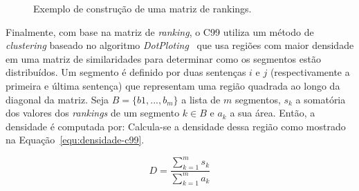 \begin{figure}[!h]
	\centering     %

	\caption{Exemplo de construção de uma matriz de rankings.%
	}
	\label{fig:exemplomatrixrank}
\end{figure}


Finalmente, com base na matriz de \textit{ranking}, o C99 utiliza um método de \textit{clustering} baseado no algoritmo \textit{DotPloting}~\cite{Reynar1998} que usa regiões com maior densidade em uma matriz de similaridades para determinar como os segmentos estão distribuídos.  
% 
Um segmento é definido por duas sentenças $i$ e $j$ (respectivamente a primeira e última sentença) que representam uma região quadrada ao longo da diagonal da matriz. 
% 
Seja $B = \{b1,...,b_m\}$ a lista de $m$ segmentos,  $s_k$ a somatória dos valores dos \textit{rankings} de um segmento $k \in B$ e $a_k$ a sua área. Então, a densidade é computada por: 
% 
Calcula-se a densidade dessa região como mostrado na Equação~\ref{equ:densidade-c99}. 



\begin{equation}
D = \frac{\sum_{k=1}^m s_k}{\sum_{k=1}^m a_k}
\label{equ:densidade-c99}
\end{equation}


